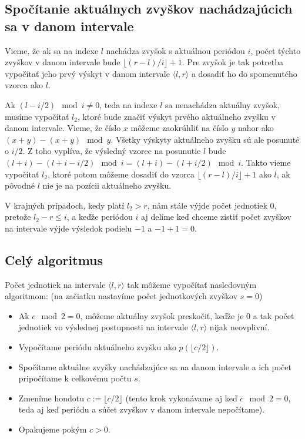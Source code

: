 \documentclass[10pt]{article}
\begin{document}
\subsection*{Spočítanie aktuálnych zvyškov nachádzajúcich sa v danom intervale}

Vieme, že ak sa na indexe $l$ nachádza zvyšok s aktuálnou periódou $i$, počet
týchto zvyškov v danom intervale bude $\lfloor(r - l) / i \rfloor + 1$. Pre
zvyšok je tak potretba vypočítať jeho prvý výskyt v danom intervale
$\langle l, r\rangle$ a dosadiť ho do spomenutého vzorca ako $l$.

Ak $(l - i / 2) \mod i \neq 0$, teda na indexe $l$ sa nenachádza aktuálny
zvyšok, musíme vypočítať $l_2$, ktoré bude značiť výskyt prvého aktuálneho
zvyšku v danom intervale. Vieme, že číslo $x$ môžeme zaokrúhliť na číslo $y$ 
nahor ako $(x + y) - (x + y) \mod y$. Všetky výskyty aktuálneho zvyšku sú
ale posunuté o $i/2$. Z toho vyplíva, že výsledný vzorec na posunutie $l$ bude
$(l + i) - (l + i - i / 2) \mod i = (l + i) - (l + i / 2) \mod i$. Takto vieme
vypočítať $l_2$, ktoré potom môžeme dosadiť do vzorca
$\lfloor(r - l) / i \rfloor + 1$ ako $l$, ak pôvodné $l$ nie je na pozícii
aktuálneho zvyšku.

V krajných prípadoch, kedy platí $l_2 > r$, nám stále výjde počet jednotiek
$0$, pretože $l_2 - r \leq i$, a keďže periódou $i$ aj delíme keď chceme zistiť
počet zvyškov na intervale výjde výsledok podielu $-1$ a $-1+1=0$. 

\subsection*{Celý algoritmus}

Počet jednotiek na intervale $\langle l, r \rangle$ tak môžeme vypočítať
nasledovným algoritmom: (na začiatku nastavíme počet jednotkových zvyškov
$s=0$)

\begin{itemize}
  \item Ak $c \mod 2 = 0$, môžeme aktuálny zvyšok preskočiť, keďže je $0$ a tak
  počet jednotiek vo výslednej postupnosti na intervale $\langle l, r \rangle$
  nijak neovplivní.
  \item Vypočítame periódu aktuálneho zvyšku ako $p(\lfloor c / 2 \rfloor)$.
  \item Spočítame aktuálne zvyšky nachádzajúce sa na danom intervale a ich
  počet pripočítame k celkovému počtu $s$.
  \item Zmeníme hondotu $c := \lfloor c / 2 \rfloor$ (tento krok vykonávame aj
  keď $c \mod 2 = 0$, teda aj keď periódu a súčet zvyškov v danom intervale
  nepočítame).
  \item Opakujeme pokým $c > 0$.
\end{itemize}
\end{document}

